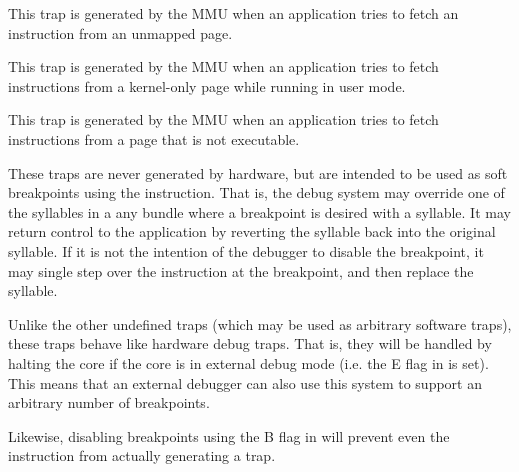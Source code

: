 
This trap is generated by the MMU when an application tries to fetch an
instruction from an unmapped page.



This trap is generated by the MMU when an application tries to fetch
instructions from a kernel-only page while running in user mode.



This trap is generated by the MMU when an application tries to fetch
instructions from a page that is not executable.


\debug{}

These traps are never generated by hardware, but are intended to be used as soft
breakpoints using the  instruction. That is, the debug system may
override one of the syllables in a any bundle where a breakpoint is desired with
a  syllable. It may return control to the application by reverting
the  syllable back into the original syllable. If it is not the
intention of the debugger to disable the breakpoint, it may single step over
the instruction at the breakpoint, and then replace the  syllable.

Unlike the other undefined traps (which may be used as arbitrary software
traps), these traps behave like hardware debug traps. That is, they will be
handled by halting the core if the core is in external debug mode (i.e. the E
flag in  is set). This means that an external debugger can also use
this system to support an arbitrary number of breakpoints.

Likewise, disabling breakpoints using the B flag in  will prevent even
the  instruction from actually generating a trap.


